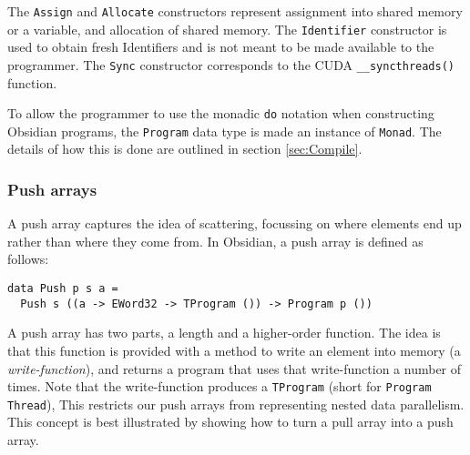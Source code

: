 The {\tt Assign} and {\tt Allocate} constructors represent assignment into 
shared memory or a variable, and allocation of shared memory. The {\tt Identifier} 
constructor is used to obtain fresh Identifiers and is not meant to be made available
to the programmer. The {\tt Sync} constructor corresponds to the 
CUDA {\tt \_\_syncthreads()} function. 

To allow the programmer to use the monadic {\tt do} notation when constructing Obsidian 
programs, the {\tt Program} data type is made an instance of {\tt Monad}. The details 
of how this is done are outlined in section \ref{sec:Compile}.




\subsubsection{Push arrays} 
\label{sec:PushArrays}

A push array captures the idea of scattering, focussing on where 
elements end up rather than where they come from. In Obsidian, a push array 
is defined as follows: 

\begin{small}
\begin{verbatim}
data Push p s a =
  Push s ((a -> EWord32 -> TProgram ()) -> Program p ())
\end{verbatim}
\end{small}

A push array has two parts, a length and a higher-order function. 
The idea is that this function is provided with a method to write an 
element into memory (a {\em write-function}), and returns a program 
that uses that write-function a number of times. Note that the 
write-function produces a {\tt TProgram} (short for {\tt Program Thread}), This 
restricts our push arrays from representing nested data parallelism. 
This concept is best illustrated by showing how to turn a pull array into a push array. 


